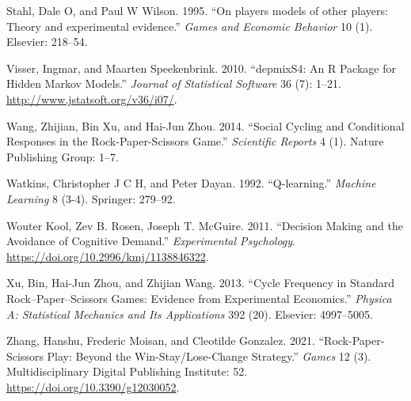 \documentclass[smallextended]{svjour3}       %
\begin{document}
\leavevmode\hypertarget{ref-stahl1995players}{}%
Stahl, Dale O, and Paul W Wilson. 1995. ``On players models of other
players: Theory and experimental evidence.'' \emph{Games and Economic
Behavior} 10 (1). Elsevier: 218--54.

\leavevmode\hypertarget{ref-R-depmixS4}{}%
Visser, Ingmar, and Maarten Speekenbrink. 2010. ``depmixS4: An R Package
for Hidden Markov Models.'' \emph{Journal of Statistical Software} 36
(7): 1--21. \url{http://www.jstatsoft.org/v36/i07/}.

\leavevmode\hypertarget{ref-wang2014social}{}%
Wang, Zhijian, Bin Xu, and Hai-Jun Zhou. 2014. ``Social Cycling and
Conditional Responses in the Rock-Paper-Scissors Game.''
\emph{Scientific Reports} 4 (1). Nature Publishing Group: 1--7.

\leavevmode\hypertarget{ref-watkins1992q}{}%
Watkins, Christopher J C H, and Peter Dayan. 1992. ``Q-learning.''
\emph{Machine Learning} 8 (3-4). Springer: 279--92.

\leavevmode\hypertarget{ref-Kool_2011}{}%
Wouter Kool, Zev B. Rosen, Joseph T. McGuire. 2011. ``Decision Making
and the Avoidance of Cognitive Demand.'' \emph{Experimental Psychology}.
\url{https://doi.org/10.2996/kmj/1138846322}.

\leavevmode\hypertarget{ref-xu2013cycle}{}%
Xu, Bin, Hai-Jun Zhou, and Zhijian Wang. 2013. ``Cycle Frequency in
Standard Rock--Paper--Scissors Games: Evidence from Experimental
Economics.'' \emph{Physica A: Statistical Mechanics and Its
Applications} 392 (20). Elsevier: 4997--5005.

\leavevmode\hypertarget{ref-zhang_rock-paper-scissors_2021}{}%
Zhang, Hanshu, Frederic Moisan, and Cleotilde Gonzalez. 2021.
``Rock-Paper-Scissors Play: Beyond the Win-Stay/Lose-Change Strategy.''
\emph{Games} 12 (3). Multidisciplinary Digital Publishing Institute: 52.
\url{https://doi.org/10.3390/g12030052}.




\end{document}
